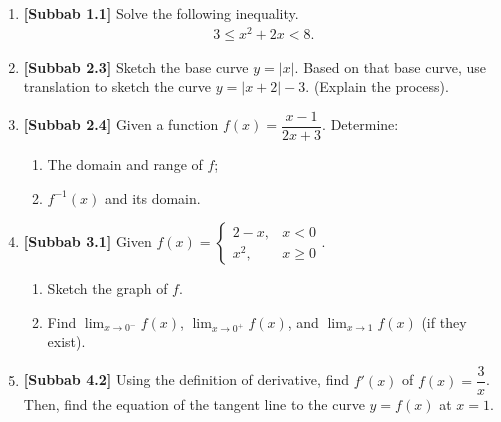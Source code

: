 \documentclass[10pt,openany,a4paper]{article}
\theoremstyle{definition}
\theoremstyle{definition}
\theoremstyle{plain}
\begin{document}
\begin{enumerate}
    \item \textbf{[Subbab 1.1]} Solve the following inequality.
    \begin{align*}
        3\leq x^2+2x<8.
    \end{align*}

    \item \textbf{[Subbab 2.3]} Sketch the base curve $y=|x|$. Based on that base curve, use translation to sketch the curve $y=|x+2|-3$. (Explain the process).

    \item \textbf{[Subbab 2.4]} Given a function $f(x)=\dfrac{x-1}{2x+3}$. Determine:
    \begin{enumerate}
        \item[a)] The domain and range of $f$;
        \item[b)] $f^{-1}(x)$ and its domain.
    \end{enumerate}

    \item \textbf{[Subbab 3.1]} Given $f(x)=\begin{cases}
        2-x, & x<0\\
        x^2, & x\geq 0
    \end{cases}$.
    \begin{enumerate}
        \item[a.] Sketch the graph of $f$.
        \item[b.] Find $\displaystyle\lim_{x\to 0^-}f(x)$, $\displaystyle\lim_{x\to 0^+}f(x)$, and $\displaystyle\lim_{x\to 1}f(x)$ (if they exist).
    \end{enumerate}

    \item \textbf{[Subbab 4.2]} Using the definition of derivative, find $f'(x)$ of $f(x)=\dfrac{3}{x}$. Then, find the equation of the tangent line to the curve $y=f(x)$ at $x=1$.
\end{enumerate}

\newpage
\end{document}
